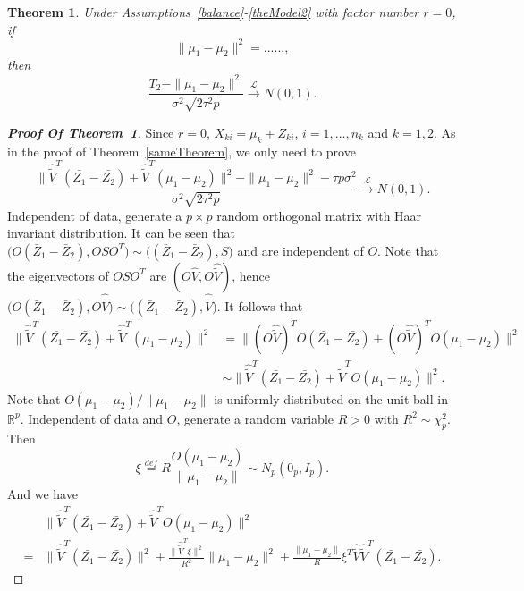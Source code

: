\documentclass[review]{elsarticle}
\theoremstyle{plain}
\newtheorem{theorem}{\quad\quad Theorem}
\theoremstyle{definition}
\theoremstyle{remark}
\begin{document}
\begin{theorem}\label{sameTheorem2}
    Under Assumptions~\ref{balance}-\ref{theModel2} with factor number $r=0$, if
    $$
    \|\mu_1-\mu_2\|^2=......,
    $$
    then
    $$
    \frac{T_2-\|\mu_1-\mu_2\|^2}{\sigma^2\sqrt{2\tau^2 p}}\xrightarrow{\mathcal{L}} N(0,1).
    $$
\end{theorem}
\begin{proof}[\textbf{Proof Of Theorem~\ref{sameTheorem2}}]
    Since $r=0$, $X_{ki}=\mu_k+Z_{ki}$, $i=1,\ldots,n_k$ and $k=1,2$.
    As in the proof of Theorem~\ref{sameTheorem}, we only need to prove
    $$
    \frac{\|\hat{\tilde{V}}^T(\bar{Z_1}-\bar{Z_2})+\hat{\tilde{V}}^T(\mu_1-\mu_2)\|^2-\|\mu_1-\mu_2\|^2-\tau p \sigma^2}{\sigma^2\sqrt{2\tau^2 p}}\xrightarrow{\mathcal{L}}N(0,1).
    $$
    Independent of data, generate a $p\times p$ random orthogonal matrix with Haar invariant distribution. It can be seen that
    $
    \big(O(\bar{Z}_1-\bar{Z}_2), OSO^T\big)\sim
    \big((\bar{Z}_1-\bar{Z}_2), S\big)
    $ and are independent of $O$.
    Note that the eigenvectors of $OSO^T$ are $(O\hat{V},O\hat{\tilde{V}})$, hence
    $
    \big(O(\bar{Z}_1-\bar{Z}_2), O\hat{\tilde{V}}\big)\sim
    \big((\bar{Z}_1-\bar{Z}_2), \hat{\tilde{V}}\big)
    $.
    It follows that
    \begin{equation*}
    \begin{aligned}
\|\hat{\tilde{V}}^T(\bar{Z_1}-\bar{Z_2})+\hat{\tilde{V}}^T(\mu_1-\mu_2)\|^2
        &=
    \|(O\hat{\tilde{V}})^T O(\bar{Z_1}-\bar{Z_2})+(O\hat{\tilde{V}})^T O(\mu_1-\mu_2)\|^2\\
        &\sim
\|\hat{\tilde{V}}^T(\bar{Z_1}-\bar{Z_2})+\hat{\tilde{V}}^T O(\mu_1-\mu_2)\|^2.
\end{aligned}
\end{equation*}
    Note that $O(\mu_1-\mu_2)/\|\mu_1-\mu_2\|$ is uniformly distributed on the unit ball in $\mathbb{R}^p$. Independent of data and $O$, generate a random variable $R>0$ with $R^2\sim\chi^2_p$. Then 
    $$
    \xi \overset{def}{=} R \frac{O(\mu_1-\mu_2)}{\|\mu_1-\mu_2\|}\sim N_p(0_p,I_p).
    $$
And we have
    \begin{equation}\label{hTheorem:4}
\begin{aligned}
    &\|\hat{\tilde{V}}^T(\bar{Z_1}-\bar{Z_2})+\hat{\tilde{V}}^T O(\mu_1-\mu_2)\|^2\\
    =&
    \|\hat{\tilde{V}}^T(\bar{Z_1}-\bar{Z_2})\|^2+\frac{\|\hat{\tilde{V}}^T\xi\|^2}{R^2}\|\mu_1-\mu_2\|^2+\frac{\|\mu_1-\mu_2\|}{R}\xi^T\hat{\tilde{V}}\hat{\tilde{V}}^T(\bar{Z_1}-\bar{Z_2}).
\end{aligned}

\end{equation}
\end{proof}
\end{document}

